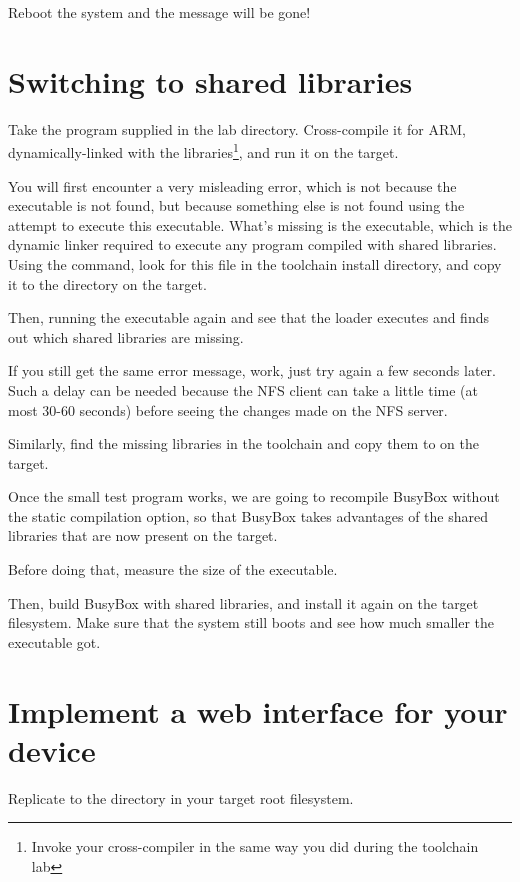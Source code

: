 Reboot the system and the message will be gone!

\section{Switching to shared libraries}

Take the  program supplied in the lab 
directory. Cross-compile it for ARM, dynamically-linked with the
libraries\footnote{Invoke your cross-compiler in the same way you
did during the toolchain lab}, and run it on the target.

You will first encounter a very misleading  error,
which is not because the  executable is not found, but
because something else is not found using the attempt to execute
this executable. What's missing is the 
executable, which is the dynamic linker required to execute any
program compiled with shared libraries. Using the 
command, look for this file in the toolchain install directory,
and copy it to the  directory on the target.

Then, running the executable again and see that the loader executes
and finds out which shared libraries are missing.

If you still get the same error message, work, just try again a
few seconds later.  Such a delay can be needed because the NFS
client can take a little time (at most 30-60 seconds) before
seeing the changes made on the NFS server.

Similarly, find the missing libraries in the toolchain and copy
them to  on the target.

Once the small test program works, we are going to recompile BusyBox
without the static compilation option, so that BusyBox takes
advantages of the shared libraries that are now present on the target.

Before doing that, measure the size of the  executable.

Then, build BusyBox with shared libraries, and install it again on the
target filesystem. Make sure that the system still boots and see how
much smaller the  executable got.

\section{Implement a web interface for your device}

Replicate  to the  directory in your target
root filesystem.

